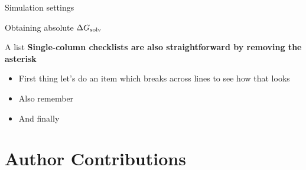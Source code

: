 \documentclass[9pt,tutorial]{livecoms}
\begin{document}
\begin{Checklists}
	
\begin{checklist}{Simulation settings}
\end{checklist}

\begin{checklist}{Obtaining absolute $\Delta G_\textup{solv}$ }
\end{checklist}

\begin{checklist}{A list}
\textbf{Single-column checklists are also straightforward by removing the asterisk}
\begin{itemize}
\item First thing let's do an item which breaks across lines to see how that looks
\item Also remember
\item And finally
\end{itemize}
\end{checklist}
%

\end{Checklists}








\section*{Author Contributions}
%
\end{document}
